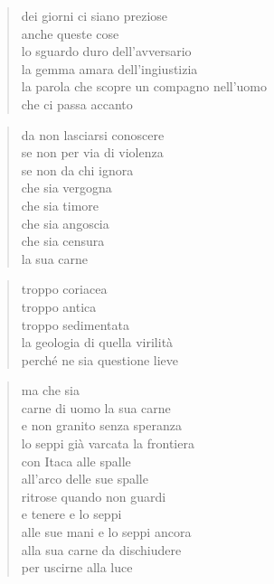 \clearpage


\vspace*{2cm}

	\begin{verse}
                dei giorni ci siano preziose\\
                anche queste cose\\
                lo sguardo duro dell’avversario\\
                la gemma amara dell’ingiustizia\\
                la parola che scopre un compagno nell’uomo\\
                che ci passa accanto
	\end{verse}

\clearpage


\vspace*{2cm}

	\begin{verse}
		da non lasciarsi conoscere\\
		se non per via di violenza\\
		se non da chi ignora\\
		che sia vergogna\\
		che sia timore\\
		che sia angoscia\\
		che sia censura\\
		la sua carne
	\end{verse}

	\begin{verse}
		troppo coriacea\\
		troppo antica\\
		troppo sedimentata\\
		la geologia di quella virilità\\
		perché ne sia questione lieve
	\end{verse}

	\begin{verse}
		ma che sia\\
		carne di uomo la sua carne\\
		e non granito senza speranza\\
		lo seppi già varcata la frontiera\\
		con Itaca alle spalle\\
		all’arco delle sue spalle\\
		ritrose quando non guardi\\
		e tenere e lo seppi\\
		alle sue mani e lo seppi ancora\\
		alla sua carne da dischiudere\\
		per uscirne alla luce
	\end{verse}

